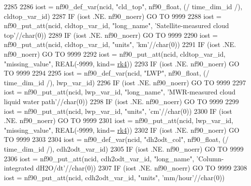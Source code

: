 \begin{DoxyCode}
{{{{{{2285 
2286     iost    = nf90\_def\_var(ncid, \textcolor{stringliteral}{"cld\_top"}, nf90\_float, (/ time\_dim\_id /), cldtop\_var\_id)
2287     \textcolor{keywordflow}{IF} (iost .NE. nf90\_noerr) \textcolor{keywordflow}{GO TO} 9999
2288     iost    = nf90\_put\_att(ncid, cldtop\_var\_id, \textcolor{stringliteral}{"long\_name"}, \textcolor{stringliteral}{'Satellite-measured cloud top'}//char(0))
2289     \textcolor{keywordflow}{IF} (iost .NE. nf90\_noerr) \textcolor{keywordflow}{GO TO} 9999
2290     iost    = nf90\_put\_att(ncid, cldtop\_var\_id, \textcolor{stringliteral}{"units"}, \textcolor{stringliteral}{'km'}//char(0))
2291     \textcolor{keywordflow}{IF} (iost .NE. nf90\_noerr) \textcolor{keywordflow}{GO TO} 9999
2292     iost    = nf90\_put\_att(ncid, cldtop\_var\_id, \textcolor{stringliteral}{"missing\_value"}, \textcolor{keywordtype}{REAL}(-9999, kind=
      \hyperlink{namespaceportable_abaed22a509442771d3fba69bebda0b33}{rk4}))
2293     \textcolor{keywordflow}{IF} (iost .NE. nf90\_noerr) \textcolor{keywordflow}{GO TO} 9999
2294 
2295     iost    = nf90\_def\_var(ncid, \textcolor{stringliteral}{"LWP"}, nf90\_float, (/ time\_dim\_id /), lwp\_var\_id)
2296     \textcolor{keywordflow}{IF} (iost .NE. nf90\_noerr) \textcolor{keywordflow}{GO TO} 9999
2297     iost    = nf90\_put\_att(ncid, lwp\_var\_id, \textcolor{stringliteral}{"long\_name"}, \textcolor{stringliteral}{'MWR-measured cloud liquid water path'}//char(0))
2298     \textcolor{keywordflow}{IF} (iost .NE. nf90\_noerr) \textcolor{keywordflow}{GO TO} 9999
2299     iost    = nf90\_put\_att(ncid, lwp\_var\_id, \textcolor{stringliteral}{"units"}, \textcolor{stringliteral}{'cm'}//char(0))
2300     \textcolor{keywordflow}{IF} (iost .NE. nf90\_noerr) \textcolor{keywordflow}{GO TO} 9999
2301     iost    = nf90\_put\_att(ncid, lwp\_var\_id, \textcolor{stringliteral}{"missing\_value"}, \textcolor{keywordtype}{REAL}(-9999, kind=
      \hyperlink{namespaceportable_abaed22a509442771d3fba69bebda0b33}{rk4}))
2302     \textcolor{keywordflow}{IF} (iost .NE. nf90\_noerr) \textcolor{keywordflow}{GO TO} 9999
2303 
2304     iost    = nf90\_def\_var(ncid, \textcolor{stringliteral}{"dh2odt\_col"}, nf90\_float, (/ time\_dim\_id /), cdh2odt\_var\_id)
2305     \textcolor{keywordflow}{IF} (iost .NE. nf90\_noerr) \textcolor{keywordflow}{GO TO} 9999
2306     iost    = nf90\_put\_att(ncid, cdh2odt\_var\_id, \textcolor{stringliteral}{"long\_name"}, \textcolor{stringliteral}{'Column-integrated dH2O/dt'}//char(0))
2307     \textcolor{keywordflow}{IF} (iost .NE. nf90\_noerr) \textcolor{keywordflow}{GO TO} 9999
2308     iost    = nf90\_put\_att(ncid, cdh2odt\_var\_id, \textcolor{stringliteral}{"units"}, \textcolor{stringliteral}{'mm/hour'}//char(0))
}}}}}}
\end{DoxyCode}
